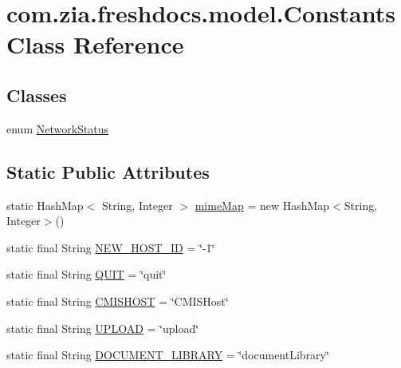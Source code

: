 \hypertarget{classcom_1_1zia_1_1freshdocs_1_1model_1_1_constants}{\section{com.\-zia.\-freshdocs.\-model.\-Constants Class Reference}
\label{classcom_1_1zia_1_1freshdocs_1_1model_1_1_constants}
}
\subsection*{Classes}
\begin{DoxyCompactItemize}
\item 
enum \hyperlink{enumcom_1_1zia_1_1freshdocs_1_1model_1_1_constants_1_1_network_status}{Network\-Status}
\end{DoxyCompactItemize}
\subsection*{Static Public Attributes}
\begin{DoxyCompactItemize}
\item 
static Hash\-Map$<$ String, Integer $>$ \hyperlink{classcom_1_1zia_1_1freshdocs_1_1model_1_1_constants_a7626074e5d5e133713a92075a38c9dda}{mime\-Map} = new Hash\-Map$<$String, Integer$>$()
\item 
static final String \hyperlink{classcom_1_1zia_1_1freshdocs_1_1model_1_1_constants_a615b002f31536d79b2668a20c41a4b33}{N\-E\-W\-\_\-\-H\-O\-S\-T\-\_\-\-I\-D} = \char`\"{}-\/1\char`\"{}
\item 
static final String \hyperlink{classcom_1_1zia_1_1freshdocs_1_1model_1_1_constants_a8dd73cdd86f6cf83e8227525333eb548}{Q\-U\-I\-T} = \char`\"{}quit\char`\"{}
\item 
static final String \hyperlink{classcom_1_1zia_1_1freshdocs_1_1model_1_1_constants_a8c3e5d74747657094fc63f33a7a9cb66}{C\-M\-I\-S\-H\-O\-S\-T} = \char`\"{}C\-M\-I\-S\-Host\char`\"{}
\item 
static final String \hyperlink{classcom_1_1zia_1_1freshdocs_1_1model_1_1_constants_a461316ea1bc0718a95872aa6afc9b632}{U\-P\-L\-O\-A\-D} = \char`\"{}upload\char`\"{}
\item 
static final String \hyperlink{classcom_1_1zia_1_1freshdocs_1_1model_1_1_constants_a5f4e434390b7361cba6d6e6c2c7127f7}{D\-O\-C\-U\-M\-E\-N\-T\-\_\-\-L\-I\-B\-R\-A\-R\-Y} = \char`\"{}document\-Library\char`\"{}
\end{DoxyCompactItemize}


